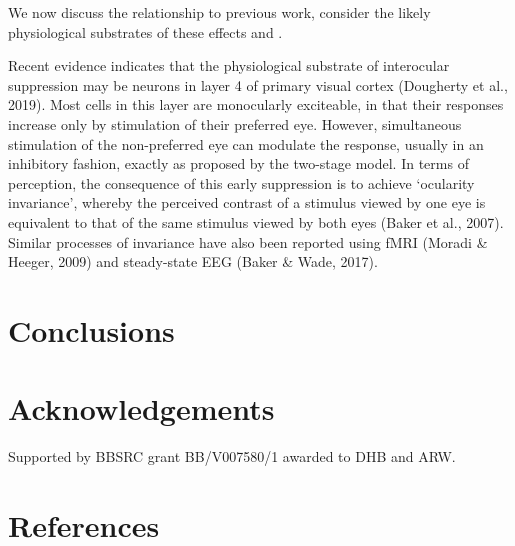 \documentclass[
]{article}
\begin{document}
We now discuss the relationship to previous work, consider the likely physiological substrates of these effects and .

Recent evidence indicates that the physiological substrate of interocular suppression may be neurons in layer 4 of primary visual cortex (Dougherty et al., 2019). Most cells in this layer are monocularly exciteable, in that their responses increase only by stimulation of their preferred eye. However, simultaneous stimulation of the non-preferred eye can modulate the response, usually in an inhibitory fashion, exactly as proposed by the two-stage model. In terms of perception, the consequence of this early suppression is to achieve `ocularity invariance', whereby the perceived contrast of a stimulus viewed by one eye is equivalent to that of the same stimulus viewed by both eyes (Baker et al., 2007). Similar processes of invariance have also been reported using fMRI (Moradi \& Heeger, 2009) and steady-state EEG (Baker \& Wade, 2017).

\hypertarget{conclusions}{%
\section{Conclusions}\label{conclusions}}

\hypertarget{acknowledgements}{%
\section{Acknowledgements}\label{acknowledgements}}

Supported by BBSRC grant BB/V007580/1 awarded to DHB and ARW.

\hypertarget{references}{%
\section{References}\label{references}}
\end{document}
